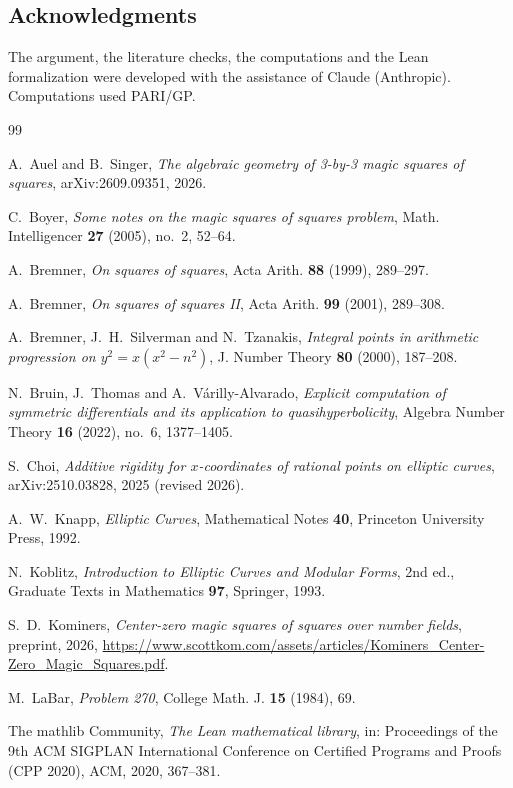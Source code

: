 \documentclass[11pt]{amsart}
\theoremstyle{definition}
\theoremstyle{remark}
\begin{document}
\subsection*{Acknowledgments}
The argument, the literature checks, the computations and the Lean formalization were developed with the
assistance of Claude (Anthropic). Computations used PARI/GP.

\begin{thebibliography}{99}

 A.~Auel and B.~Singer, \emph{The algebraic geometry of 3-by-3 magic squares of squares},
arXiv:2609.09351, 2026.

 C.~Boyer, \emph{Some notes on the magic squares of squares problem}, Math. Intelligencer
\textbf{27} (2005), no.~2, 52--64.

 A.~Bremner, \emph{On squares of squares}, Acta Arith. \textbf{88} (1999), 289--297.

 A.~Bremner, \emph{On squares of squares II}, Acta Arith. \textbf{99} (2001), 289--308.

 A.~Bremner, J.~H.~Silverman and N.~Tzanakis, \emph{Integral points in arithmetic
progression on $y^2=x(x^2-n^2)$}, J. Number Theory \textbf{80} (2000), 187--208.

 N.~Bruin, J.~Thomas and A.~V\'arilly-Alvarado, \emph{Explicit computation of symmetric
differentials and its application to quasihyperbolicity}, Algebra Number Theory \textbf{16} (2022),
no.~6, 1377--1405.

 S.~Choi, \emph{Additive rigidity for $x$-coordinates of rational points on elliptic
curves}, arXiv:2510.03828, 2025 (revised 2026).

 A.~W.~Knapp, \emph{Elliptic Curves}, Mathematical Notes \textbf{40}, Princeton University
Press, 1992.

 N.~Koblitz, \emph{Introduction to Elliptic Curves and Modular Forms}, 2nd ed., Graduate Texts
in Mathematics \textbf{97}, Springer, 1993.

 S.~D.~Kominers, \emph{Center-zero magic squares of squares over number fields},
preprint, 2026,
\url{https://www.scottkom.com/assets/articles/Kominers_Center-Zero_Magic_Squares.pdf}.

 M.~LaBar, \emph{Problem 270}, College Math. J. \textbf{15} (1984), 69.

 The mathlib Community, \emph{The Lean mathematical library}, in: Proceedings of the 9th
ACM SIGPLAN International Conference on Certified Programs and Proofs (CPP 2020), ACM, 2020, 367--381.


\end{thebibliography}
\end{document}
